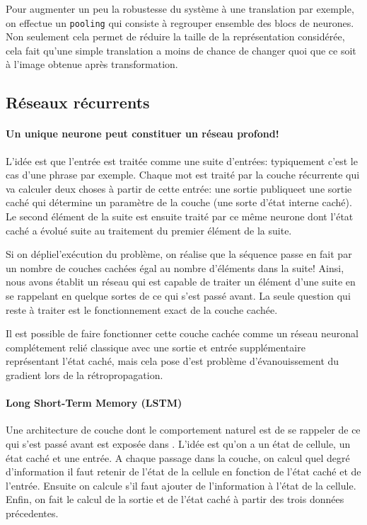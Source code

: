 \documentclass[a4paper,11pt]{article}
\begin{document}
Pour augmenter un peu la robustesse du système à une translation par exemple, on
effectue un \texttt{pooling} qui consiste à regrouper ensemble des blocs de
neurones. Non seulement cela permet de réduire la taille de la représentation
considérée, cela fait qu'une simple translation a moins de chance de changer
quoi que ce soit à l'image obtenue après transformation.

\subsection{Réseaux récurrents}

\paragraph{Un unique neurone peut constituer un réseau profond!}

L'idée est que l'entrée est traitée comme une suite d'entrées:
typiquement c'est le cas d'une phrase par exemple. Chaque mot est traité par la
couche récurrente qui va calculer deux choses à partir de cette entrée: une
sortie \og publique\fg et une sortie caché qui détermine un paramètre de la
couche (une sorte d'état interne caché). Le second élément de la suite est
ensuite traité par ce même neurone dont l'état caché a évolué suite au
traitement du premier élément de la suite.

Si on \og déplie\fg l'exécution du problème, on réalise que la séquence passe en
fait par un nombre de couches cachées égal au nombre d'éléments dans la suite!
Ainsi, nous avons établit un réseau qui est capable de traiter un élément d'une
suite en se rappelant en quelque sortes de ce qui s'est passé avant. La seule
question qui reste à traiter est le fonctionnement exact de la couche cachée.

Il est possible de faire fonctionner cette couche cachée comme un réseau neuronal
complétement relié classique avec une sortie et entrée supplémentaire
représentant l'état caché, mais cela pose d'est problème d'évanouissement du
gradient lors de la rétropropagation.

\paragraph{Long Short-Term Memory (LSTM)}

Une architecture de couche dont le comportement naturel est de se rappeler de ce
qui s'est passé avant est exposée dans . L'idée est qu'on a un état de
cellule, un état caché et une entrée. A chaque passage dans la couche, on calcul
quel degré d'information il faut retenir de l'état de la cellule en fonction de
l'état caché et de l'entrée. Ensuite on calcule s'il faut ajouter de
l'information à l'état de la cellule. Enfin, on fait le calcul de la sortie et
de l'état caché à partir des trois données précedentes.
\end{document}
